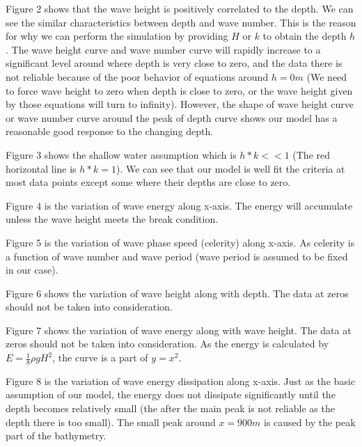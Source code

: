 %
Figure 2 shows that the wave height is positively correlated to the depth. We can see the similar characteristics between depth and wave number. This is the reason for why we can perform the simulation by providing ${H}$ or ${k}$ to obtain the depth ${h}$. The wave height curve and wave number curve will rapidly increase to a significant level around where depth is very close to zero, and the data there is not reliable because of the poor behavior of equations around $h=0 m$ (We need to force wave height to zero when depth is close to zero, or the wave height given by those equations will turn to infinity). However, the shape of wave height curve or wave number curve around the peak of depth curve shows our model has a reasonable good response to the changing depth.

Figure 3 shows the shallow water assumption which is $h*k<<1$ (The red horizontal line is $h*k=1$). We can see that our model is well fit the criteria at most data points except some where their depths are close to zero.

Figure 4 is the variation of wave energy along x-axis. The energy will accumulate unless the wave height meets the break condition.

Figure 5 is the variation of wave phase speed (celerity) along x-axis. As celerity is a function of wave number and wave period (wave period is assumed to be fixed in our case). 

Figure 6 shows the variation of wave height along with depth. The data at zeros should not be taken into consideration.

Figure 7 shows the variation of wave energy along with wave height. The data at zeros should not be taken into consideration. As the energy is calculated by $E=\frac{1}{8}\rho g H^2$, the curve is a part of $y=x^2$.

Figure 8 is the variation of wave energy dissipation along x-axis. Just as the basic assumption of our model, the energy does not dissipate significantly until the depth becomes relatively small (the after the main peak is not reliable as the depth there is too small). The small peak around $x=900 m$ is caused by the peak part of the bathymetry.


